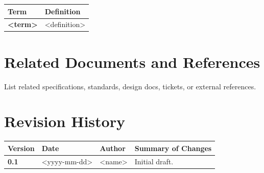 \documentclass[11pt]{article}
\begin{document}
\begin{longtable}{>{\bfseries}p{} p{}}
Term & Definition \\
\hline
<term> & <definition> \\
\end{longtable}

\section{Related Documents and References}
List related specifications, standards, design docs, tickets, or
external references.

\section{Revision History}
\begin{longtable}{@{}>{\bfseries}p{} p{} p{} p{}@{}}
Version & Date & Author & Summary of Changes \\
\hline
0.1 & <yyyy-mm-dd> & <name> & Initial draft. \\
\end{longtable}
\end{document}
